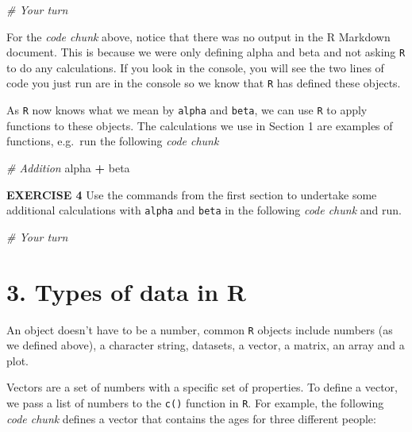 \documentclass[
]{article}
\newenvironment{Shaded}{\begin{snugshade}}{\end{snugshade}}
\newcommand{\CommentTok}[1]{\textcolor[rgb]{0.56,0.35,0.01}{\textit{#1}}}
\newcommand{\NormalTok}[1]{#1}
\newcommand{\OperatorTok}[1]{\textcolor[rgb]{0.81,0.36,0.00}{\textbf{#1}}}
\newcommand{\StringTok}[1]{\textcolor[rgb]{0.31,0.60,0.02}{#1}}
\begin{document}
\begin{Shaded}
\begin{Highlighting}[]
\CommentTok{# Your turn}
\end{Highlighting}
\end{Shaded}

For the \emph{code chunk} above, notice that there was no output in the
R Markdown document. This is because we were only defining alpha and
beta and not asking \texttt{R} to do any calculations. If you look in
the console, you will see the two lines of code you just run are in the
console so we know that \texttt{R} has defined these objects.

As \texttt{R} now knows what we mean by \texttt{alpha} and
\texttt{beta}, we can use \texttt{R} to apply functions to these
objects. The calculations we use in Section 1 are examples of functions,
e.g.~run the following \emph{code chunk}

\begin{Shaded}
\begin{Highlighting}[]
\CommentTok{# Addition}
\NormalTok{alpha }\OperatorTok{+}\StringTok{ }\NormalTok{beta}
\end{Highlighting}
\end{Shaded}

\textbf{EXERCISE 4} Use the commands from the first section to undertake
some additional calculations with \texttt{alpha} and \texttt{beta} in
the following \emph{code chunk} and run.

\begin{Shaded}
\begin{Highlighting}[]
\CommentTok{# Your turn}
\end{Highlighting}
\end{Shaded}

\hypertarget{types-of-data-in-r}{%
\section{3. Types of data in R}\label{types-of-data-in-r}}

An object doesn't have to be a number, common \texttt{R} objects include
numbers (as we defined above), a character string, datasets, a vector, a
matrix, an array and a plot.

Vectors are a set of numbers with a specific set of properties. To
define a vector, we pass a list of numbers to the \texttt{c()} function
in \texttt{R}. For example, the following \emph{code chunk} defines a
vector that contains the ages for three different people:
\end{document}
